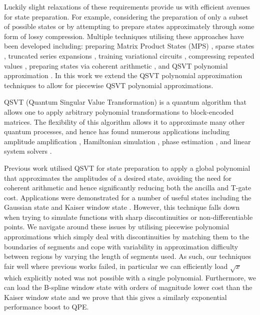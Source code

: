 \documentclass[aps,prx,twocolumn,floatfix,10pt,amssymb,amsfont,amsmath,superscriptaddress,float,nofootinbib,longbibliography,nobalancelastpage]{revtex4-2}
\theoremstyle{empty}
\begin{document}
Luckily slight relaxations of these requirements provide us with efficient avenues for state preparation. For example, considering the preparation of only a subset of possible states or by attempting to prepare states approximately through some form of lossy compression. Multiple techniques utilising these approaches have been developed including: preparing Matrix Product States (MPS) \cite{Ran_2020, 9259933, Melnikov_2023, PhysRevA.101.010301, PhysRevResearch.4.043007, Iaconis:2023rna, PhysRevLett.132.040404}, sparse states \cite{Zhang2022}, truncated series expansions \cite{Welch_2014, Zylberman:2023knk, Moosa:2023ecz}, training variational circuits \cite{Zoufal_2019, Nakaji:2021dew, Marin-Sanchez:2021ast}, compressing repeated values \cite{Sunderhauf:2023xrz, PhysRevResearch.5.013200}, preparing states via coherent arithmetic \cite{Bhaskar:2015jjo, Haner:2018yea}, and QSVT polynomial approximation \cite{mcardleQuantumStatePreparation2022, Gonzalez-Conde:2023fjg}. In this work we extend the QSVT polynomial approximation techniques to allow for piecewise QSVT polynomial approximations.

QSVT (Quantum Singular Value Transformation) \cite{Gilyen:2018khw} is a quantum algorithm that allows one to apply arbitrary polynomial transformations to block-encoded matrices. The flexibility of this algorithm allows it to approximate many other quantum processes, and hence has found numerous applications including amplitude amplification  \cite{Gilyen:2018khw}, Hamiltonian simulation  \cite{Gilyen:2018khw}, phase estimation \cite{Martyn:2021eaf}, and linear system solvers \cite{Gilyen:2018khw}. 

Previous work utilised QSVT for state preparation to apply a global polynomial that approximates the amplitudes of a desired state, avoiding the need for coherent arithmetic and hence significantly reducing both the ancilla and T-gate cost. Applications were demonstrated for a number of useful states including the Gaussian state and Kaiser window state \cite{mcardleQuantumStatePreparation2022}. However, this technique falls down when trying to simulate functions with sharp discontinuities or non-differentiable points. We navigate around these issues by utilising piecewise polynomial approximations which simply deal with discontinuities by matching them to the boundaries of segments and cope with variability in approximation difficulty between regions by varying the length of segments used. As such, our techniques fair well where previous works failed, in particular we can efficiently load $\sqrt{x}$ which \cite{mcardleQuantumStatePreparation2022} explicitly noted was not possible with a single polynomial. Furthermore, we can load the B-spline window state with orders of magnitude lower cost than the Kaiser window state and we prove that this gives a similarly exponential performance boost to QPE. 
\end{document}
